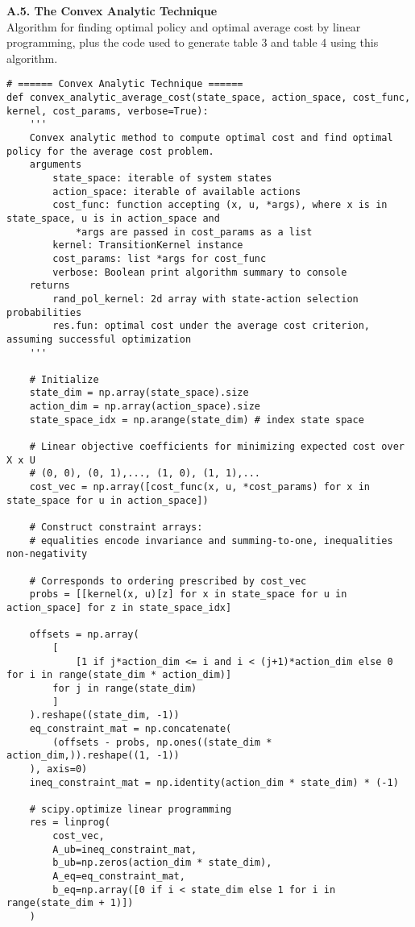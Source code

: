 \documentclass[10pt]{article}
\newcommand{\1}[1]{\mathbbm{1}_{#1}}
\begin{document}
    {\bf A.5. The Convex Analytic Technique}\\[5pt]
    Algorithm for finding optimal policy and optimal average cost by linear programming, plus the code used to generate
    table 3 and table 4 using this algorithm.
    \begin{verbatim}
# ====== Convex Analytic Technique ======
def convex_analytic_average_cost(state_space, action_space, cost_func, kernel, cost_params, verbose=True):
    '''
    Convex analytic method to compute optimal cost and find optimal policy for the average cost problem.
    arguments
        state_space: iterable of system states
        action_space: iterable of available actions
        cost_func: function accepting (x, u, *args), where x is in state_space, u is in action_space and
            *args are passed in cost_params as a list
        kernel: TransitionKernel instance
        cost_params: list *args for cost_func
        verbose: Boolean print algorithm summary to console
    returns
        rand_pol_kernel: 2d array with state-action selection probabilities
        res.fun: optimal cost under the average cost criterion, assuming successful optimization
    '''

    # Initialize
    state_dim = np.array(state_space).size 
    action_dim = np.array(action_space).size
    state_space_idx = np.arange(state_dim) # index state space
    
    # Linear objective coefficients for minimizing expected cost over X x U
    # (0, 0), (0, 1),..., (1, 0), (1, 1),...
    cost_vec = np.array([cost_func(x, u, *cost_params) for x in state_space for u in action_space]) 

    # Construct constraint arrays:
    # equalities encode invariance and summing-to-one, inequalities non-negativity

    # Corresponds to ordering prescribed by cost_vec
    probs = [[kernel(x, u)[z] for x in state_space for u in action_space] for z in state_space_idx]

    offsets = np.array(
        [
            [1 if j*action_dim <= i and i < (j+1)*action_dim else 0 for i in range(state_dim * action_dim)]
        for j in range(state_dim)
        ]
    ).reshape((state_dim, -1))
    eq_constraint_mat = np.concatenate(
        (offsets - probs, np.ones((state_dim * action_dim,)).reshape((1, -1))
    ), axis=0)
    ineq_constraint_mat = np.identity(action_dim * state_dim) * (-1)

    # scipy.optimize linear programming
    res = linprog(
        cost_vec,
        A_ub=ineq_constraint_mat,
        b_ub=np.zeros(action_dim * state_dim),
        A_eq=eq_constraint_mat,
        b_eq=np.array([0 if i < state_dim else 1 for i in range(state_dim + 1)])
    )


\end{verbatim}
\end{document}
